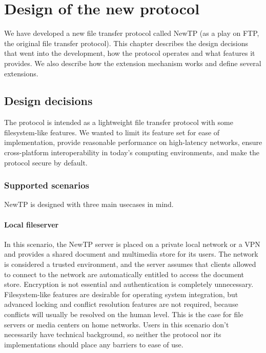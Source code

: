 
\chapter{Design of the new protocol}

We have developed a new file transfer protocol called NewTP (as a play on FTP, the original file transfer
protocol). This chapter describes the design decisions that went into the development, how the protocol
operates and what features it provides. We also describe how the extension mechanism works and define several
extensions.


\section{Design decisions}

The protocol is intended as a lightweight file transfer protocol with some filesystem-like features. We wanted
to limit its feature set for ease of implementation, provide reasonable performance on high-latency networks,
ensure cross-platform interoperability in today's computing environments, and make the protocol secure by
default.

\subsection{Supported scenarios}

NewTP is designed with three main usecases in mind.

\subsubsection{Local fileserver}

In this scenario, the NewTP server is placed on a private local network or a VPN and provides a shared
document and multimedia store for its users. The network is considered a trusted environment, and the server
assumes that clients allowed to connect to the network are automatically entitled to access the document
store.  Encryption is not essential and authentication is completely unnecessary. Filesystem-like features are
desirable for operating system integration, but advanced locking and conflict resolution features are not
required, because conflicts will usually be resolved on the human level. This is the case for file servers or
media centers on home networks. Users in this scenario don't necessarily have technical background, so neither
the protocol nor its implementations should place any barriers to ease of use.

